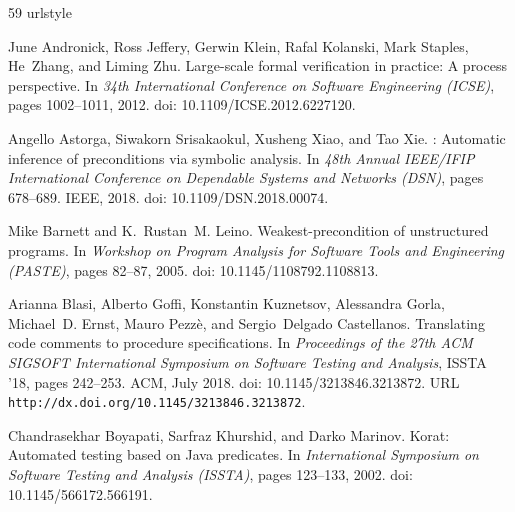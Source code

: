 \documentclass[11pt]{article}
\begin{document}

\begin{thebibliography}{59}
\providecommand{\natexlab}[1]{#1}
\providecommand{\url}[1]{\texttt{#1}}
\expandafter\ifx\csname urlstyle\endcsname\relax
  \providecommand{\doi}[1]{doi: #1}\else
  \providecommand{\doi}{doi: \begingroup \urlstyle{rm}\Url}\fi

June Andronick, Ross Jeffery, Gerwin Klein, Rafal Kolanski, Mark Staples,
  He~Zhang, and Liming Zhu.
\newblock Large-scale formal verification in practice: A process perspective.
\newblock In \emph{34th International Conference on Software Engineering
  (ICSE)}, pages 1002--1011, 2012.
\newblock \doi{10.1109/ICSE.2012.6227120}.

Angello Astorga, Siwakorn Srisakaokul, Xusheng Xiao, and Tao Xie.
: Automatic inference of preconditions via symbolic
  analysis.
\newblock In \emph{48th Annual IEEE/IFIP International Conference on Dependable
  Systems and Networks (DSN)}, pages 678--689. IEEE, 2018.
\newblock \doi{10.1109/DSN.2018.00074}.

Mike Barnett and K.~Rustan~M. Leino.
\newblock Weakest-precondition of unstructured programs.
\newblock In \emph{Workshop on Program Analysis for Software Tools and
  Engineering (PASTE)}, pages 82--87, 2005.
\newblock \doi{10.1145/1108792.1108813}.

Arianna Blasi, Alberto Goffi, Konstantin Kuznetsov, Alessandra Gorla,
  Michael~D. Ernst, Mauro Pezz\`{e}, and Sergio~Delgado Castellanos.
\newblock Translating code comments to procedure specifications.
\newblock In \emph{Proceedings of the 27th ACM SIGSOFT International Symposium
  on Software Testing and Analysis}, ISSTA '18, pages 242--253. ACM, July 2018.
\newblock \doi{10.1145/3213846.3213872}.
\newblock URL \url{http://dx.doi.org/10.1145/3213846.3213872}.

Chandrasekhar Boyapati, Sarfraz Khurshid, and Darko Marinov.
\newblock Korat: Automated testing based on {Java} predicates.
\newblock In \emph{International Symposium on Software Testing and Analysis
  (ISSTA)}, pages 123--133, 2002.
\newblock \doi{10.1145/566172.566191}.


\end{thebibliography}
\end{document}
